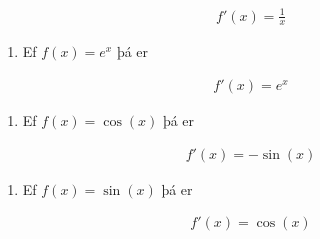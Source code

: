 \documentclass[a4paper,10pt,icelandic]{sphinxmanual}
\begin{document}
\begin{equation*}
\begin{split}f'(x) = \frac{1}{x}\end{split}
\end{equation*}\begin{enumerate}
%
\setcounter{enumi}{5}
\item {} 
Ef \(f(x) = e^x\) þá er

\end{enumerate}
\begin{equation*}
\begin{split}f'(x) = e^x\end{split}
\end{equation*}\begin{enumerate}
%
\setcounter{enumi}{6}
\item {} 
Ef \(f(x)=\cos(x)\) þá er

\end{enumerate}
\begin{equation*}
\begin{split}f'(x)=-\sin(x)\end{split}
\end{equation*}\begin{enumerate}
%
\setcounter{enumi}{7}
\item {} 
Ef \(f(x)=\sin(x)\) þá er

\end{enumerate}
\begin{equation*}
\begin{split}f'(x)=\cos(x)\end{split}
\end{equation*}


\renewcommand{\indexname}{Atriðaskrá}
\printindex
\end{document}
